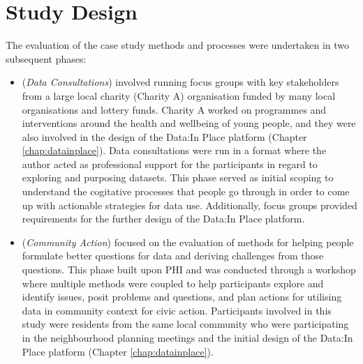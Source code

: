 \section{Study Design}
\label{sec:cs3_design}
The evaluation of the case study methods and processes were undertaken in two subsequent phases:

\begin{itemize}
\item[PHI.] (\textit{Data Consultations}) involved running focus groups with key stakeholders from a large local charity (Charity A) organisation funded by many local organisations and lottery funds. Charity A worked on programmes and interventions around the health and wellbeing of young people, and they were also involved in the design of the Data:In Place platform (Chapter \ref{chap:datainplace}). Data consultations were run in a format where the author acted as professional support for the participants in regard to exploring and purposing datasets. This phase served as initial scoping to understand the cogitative processes that people go through in order to come up with actionable strategies for data use. Additionally, focus groups provided requirements for the further design of the Data:In Place platform.

\item[PHII.] (\textit{Community Action}) focused on the evaluation of methods for helping people formulate better questions for data and deriving challenges from those questions. This phase built upon PHI and was conducted through a workshop where multiple methods were coupled to help participants explore and identify issues, posit problems and questions, and plan actions for utilising data in community context for civic action. Participants involved in this study were residents from the same local community who were participating in the neighbourhood planning meetings and the initial design of the Data:In Place platform (Chapter \ref{chap:datainplace}).
\end{itemize}

